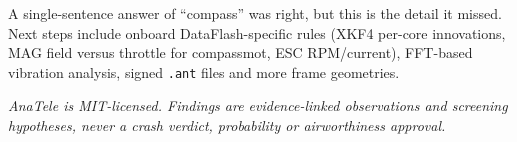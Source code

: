 \documentclass[11pt,a4paper]{article}
\newcommand{\code}[1]{\texttt{#1}}
\begin{document}
\noindent A single-sentence answer of ``compass'' was right, but this is the detail it missed. Next steps
include onboard DataFlash-specific rules (XKF4 per-core innovations, MAG field versus throttle for
compassmot, ESC RPM/current), FFT-based vibration analysis, signed \code{.ant} files and more
frame geometries.

\vspace{1em}
\noindent\textit{AnaTele is MIT-licensed. Findings are evidence-linked observations and screening
hypotheses, never a crash verdict, probability or airworthiness approval.}
\end{document}
